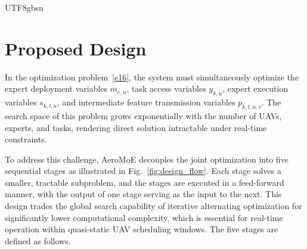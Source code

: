 \documentclass[journal]{IEEEtran}
\begin{document}
\begin{CJK*}{UTF8}{gbsn}



\section{Proposed Design}
\label{sec:design}


In the optimization problem~\eqref{e16}, the system must simultaneously optimize the expert deployment variables \(m_{e,u}\), task access variables \(y_{k,u}\), expert execution variables \(s_{k,l,u}\), and intermediate feature transmission variables \(p_{k,l,u,v}\). The search space of this problem grows exponentially with the number of UAVs, experts, and tasks, rendering direct solution intractable under real-time constraints.

To address this challenge, AeroMoE decouples the joint optimization into five sequential stages as illustrated in Fig.~\ref{fig:design_flow}. Each stage solves a smaller, tractable subproblem, and the stages are executed in a feed-forward manner, with the output of one stage serving as the input to the next. This design trades the global search capability of iterative alternating optimization for significantly lower computational complexity, which is essential for real-time operation within quasi-static UAV scheduling windows. The five stages are defined as follows.


\end{CJK*}
\end{document}
